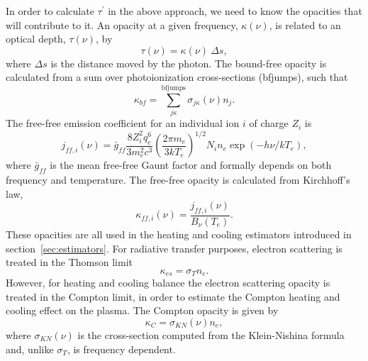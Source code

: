 In order to calculate $\tau^\prime$ in the above approach, we need
to know the opacities that will contribute to it. An opacity 
at a given frequency, $\kappa(\nu)$,
is related to an optical depth, $\tau(\nu)$, by
\begin{equation}
\tau(\nu) = \kappa(\nu)~\Delta s,
\end{equation}
where $\Delta s$ is the distance moved by the photon. The bound-free
opacity is calculated from a sum over photoionization cross-sections (bfjumps),
such that
\begin{equation}
\kappa_{bf} = \sum_{j\kappa}^{\mathrm{bfjumps}} \sigma_{j\kappa} (\nu) n_j.
\end{equation}
The free-free emission coefficient for an individual ion $i$ of charge $Z_i$ 
is \citep{gayet1970}
\begin{equation}
j_{ff,i} (\nu) = \bar{g}_{ff}\frac{8 Z_i^2 q_e^6}{3m_e^2 c^3}
\left( \frac{2\pi m_e}{3 k T_e} \right)^{1/2}
N_i n_e \exp(-h\nu/kT_e),
\label{eq:jff} 
\end{equation}
where $\bar{g}_{ff}$ is the mean free-free Gaunt factor and formally
depends on both frequency and temperature.
The free-free opacity is calculated from Kirchhoff's law, 
\begin{equation}
\kappa_{ff, i}(\nu) = \frac{j_{ff,i} (\nu)}{B_\nu (T_e)}.
\end{equation}
These opacities are all used in the heating and cooling estimators 
introduced in section~\ref{sec:estimators}.
For radiative transfer purposes, electron scattering is treated in the Thomson
limit 
\begin{equation}
\kappa_{es} = \sigma_T n_e.
\end{equation}
However, for heating and cooling balance the electron scattering opacity 
is treated in the Compton limit, in order to estimate the Compton heating and cooling 
effect on the plasma. The Compton opacity is given by
\begin{equation}
\kappa_{C} = \sigma_{KN} (\nu) n_e,
\end{equation}
where $\sigma_{KN} (\nu)$ is the cross-section computed 
from the Klein-Nishina formula \citep{klein-nishina} and, unlike $\sigma_T$,
is frequency dependent. 


